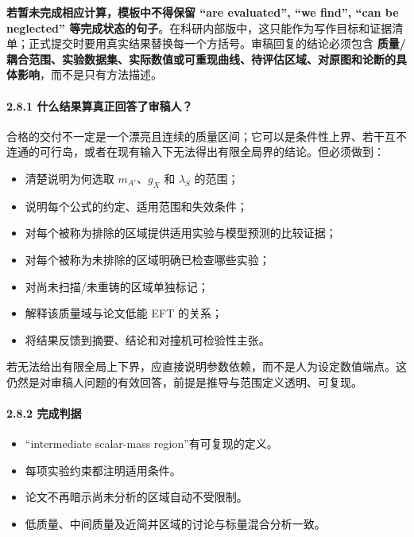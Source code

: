 \documentclass[
]{article}
\providecommand{\tightlist}{%
  \setlength{\itemsep}{0pt}\setlength{\parskip}{0pt}}
\begin{document}
\textbf{若暂未完成相应计算，模板中不得保留 ``are evaluated'', ``we
find'', ``can be neglected''
等完成状态的句子}。在科研内部版中，这只能作为写作目标和证据清单；正式提交时要用真实结果替换每一个方括号。审稿回复的结论必须包含
\textbf{质量/耦合范围、实验数据集、实际数值或可重现曲线、待评估区域、对原图和论断的具体影响}，而不是只有方法描述。

\paragraph{2.8.1
什么结果算真正回答了审稿人？}\label{ux4ec0ux4e48ux7ed3ux679cux7b97ux771fux6b63ux56deux7b54ux4e86ux5ba1ux7a3fux4eba}

合格的交付不一定是一个漂亮且连续的质量区间；它可以是条件性上界、若干互不连通的可行岛，或者在现有输入下无法得出有限全局界的结论。但必须做到：

\begin{itemize}
\tightlist
\item
  清楚说明为何选取 \(m_{A'}\)、\(g_X\) 和 \(\lambda_S\) 的范围；
\item
  说明每个公式的约定、适用范围和失效条件；
\item
  对每个被称为排除的区域提供适用实验与模型预测的比较证据；
\item
  对每个被称为未排除的区域明确已检查哪些实验；
\item
  对尚未扫描/未重铸的区域单独标记；
\item
  解释该质量域与论文低能 EFT 的关系；
\item
  将结果反馈到摘要、结论和对撞机可检验性主张。
\end{itemize}

若无法给出有限全局上下界，应直接说明参数依赖，而不是人为设定数值端点。这仍然是对审稿人问题的有效回答，前提是推导与范围定义透明、可复现。

\paragraph{2.8.2 完成判据}\label{ux5b8cux6210ux5224ux636e}

\begin{itemize}
\tightlist
\item
  ``intermediate scalar-mass region''有可复现的定义。
\item
  每项实验约束都注明适用条件。
\item
  论文不再暗示尚未分析的区域自动不受限制。
\item
  低质量、中间质量及近简并区域的讨论与标量混合分析一致。
\end{itemize}
\end{document}
